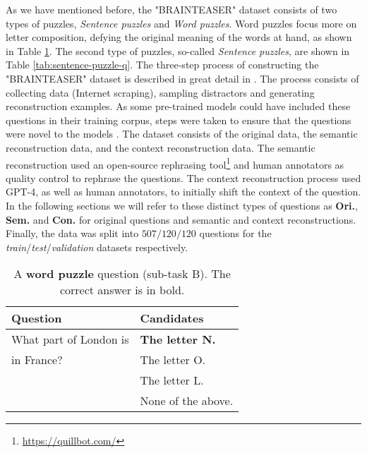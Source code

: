 As we have mentioned before, the "BRAINTEASER" dataset consists of two types of puzzles, \textit{Sentence puzzles} and \textit{Word puzzles}.
Word puzzles focus more on letter composition, defying the original meaning of the words at hand, as shown in Table \ref{tab:word-puzzle-q}.
The second type of puzzles, so-called \textit{Sentence puzzles}, are shown in Table \ref{tab:sentence-puzzle-q}.
The three-step process of constructing the "BRAINTEASER" dataset is described in great detail in \citep{semeval}.
The process consists of collecting data (Internet scraping), sampling distractors and generating reconstruction examples.
As some pre-trained models could have included these questions in their training corpus, steps were taken to ensure that the questions were novel to the models \cite{fine-tune}.
The dataset consists of the original data, the semantic reconstruction data, and the context reconstruction data.
The semantic reconstruction used an open-source rephrasing tool\footnote[2]{\url{https://quillbot.com/}} and human annotators as quality control to rephrase the questions. The context reconstruction process used GPT-4, as well as human annotators, to initially shift the context of the question.
In the following sections we will refer to these distinct types of questions as \textbf{Ori.}, \textbf{Sem.} and \textbf{Con.} for original questions and semantic and context reconstructions.
Finally, the data was split into $507/120/120$ questions for the \textit{train}/\textit{test}/\textit{validation} datasets respectively.
\begin{table}
	\caption{A \textbf{word puzzle} question (sub-task B). The correct answer is in bold.}
	\label{tab:word-puzzle-q}
	\begin{center}
		\begin{tabular}{p{3.5cm}|p{3.5cm}}
			\toprule
			Question               & Candidates             \\
			\midrule
			What part of London is & \textbf{The letter N.} \\
			in France?             & The letter O.          \\
			                       & The letter L.          \\
			                       & None of the above.     \\
			\bottomrule
		\end{tabular}
	\end{center}
\end{table}

